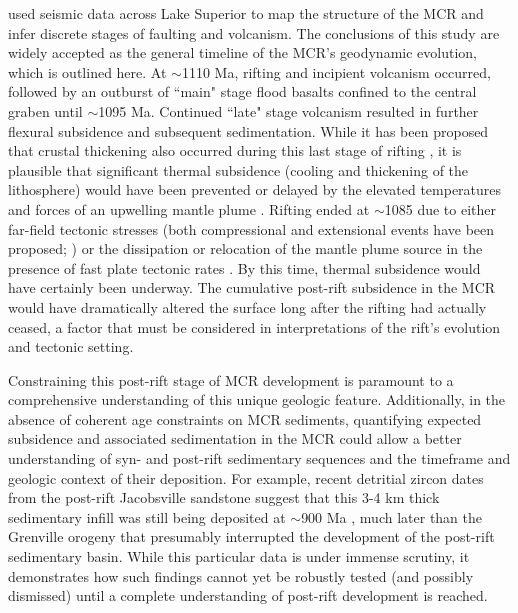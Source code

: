 \documentclass[12pt,letterpaper]{article}
\begin{document}
\cite{Cannon1992a} used seismic data across Lake Superior to map the structure of the MCR and infer discrete stages of faulting and volcanism. The conclusions of this study are widely accepted as the general timeline of the MCR's geodynamic evolution, which is outlined here. At $\sim$1110 Ma, rifting and incipient volcanism occurred, followed by an outburst of ``main" stage flood basalts confined to the central graben until $\sim$1095 Ma. Continued ``late" stage volcanism resulted in further flexural subsidence and subsequent sedimentation. While it has been proposed that crustal thickening also occurred during this last stage of rifting \citep{Stein2015a}, it is plausible that significant thermal subsidence (cooling and thickening of the lithosphere) would have been prevented or delayed by the elevated temperatures and forces of an upwelling mantle plume \citep{White1997a}. Rifting ended at $\sim$1085 due to either far-field tectonic stresses (both compressional and extensional events have been proposed; \cite{Stein2014a,Cannon1994a}) or the dissipation or relocation of the mantle plume source in the presence of fast plate tectonic rates \citep{Swanson-Hysell2014a}. By this time, thermal subsidence would have certainly been underway. The cumulative post-rift subsidence in the MCR would have dramatically altered the surface long after the rifting had actually ceased, a factor that must be considered in interpretations of the rift's evolution and tectonic setting.\par

Constraining this post-rift stage of MCR development is paramount to a comprehensive understanding of this unique geologic feature. Additionally, in the absence of coherent age constraints on MCR sediments, quantifying expected subsidence and associated sedimentation in the MCR could allow a better understanding of syn- and post-rift sedimentary sequences and the timeframe and geologic context of their deposition. For example, recent detritial zircon dates from the post-rift Jacobsville sandstone suggest that this 3-4 km thick sedimentary infill was still being deposited at $\sim$900 Ma \citep{Craddock2013a}, much later than the Grenville orogeny that presumably interrupted the development of the post-rift sedimentary basin. While this particular data is under immense scrutiny, it demonstrates how such findings cannot yet be robustly tested (and possibly dismissed) until a complete understanding of post-rift development is reached.\par
\end{document}
